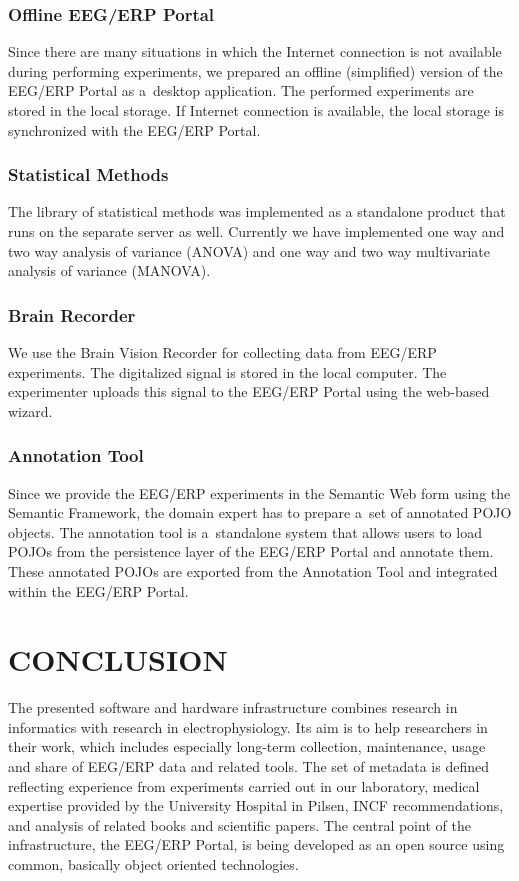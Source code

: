 \documentclass[a4paper,twoside]{article}
\begin{document}
\subsubsection{Offline EEG/ERP Portal}

Since there are many situations in which the Internet connection is not available during performing experiments, we prepared an offline (simplified) version of the EEG/ERP Portal as a~desktop application. The performed experiments are stored in the local storage. If Internet connection is available, the local storage is synchronized with the EEG/ERP Portal.

\subsubsection{Statistical Methods}

The library of statistical methods was implemented as a standalone product that runs on the separate server as well. Currently we have implemented one way and two way analysis of variance (ANOVA) and one way and two way multivariate analysis of variance (MANOVA).

\subsubsection{Brain Recorder}

We use the Brain Vision Recorder for collecting data from EEG/ERP experiments. The digitalized signal is stored in the local computer. The experimenter uploads this signal to the EEG/ERP Portal using the web-based wizard.

\subsubsection{Annotation Tool}

Since we provide the EEG/ERP experiments in the Semantic Web form using the Semantic Framework, the domain expert has to prepare a~set of annotated POJO objects. The annotation tool is a~standalone system that allows users to load POJOs from the persistence layer of the EEG/ERP Portal and annotate them. These annotated POJOs are exported from the Annotation Tool and integrated within the EEG/ERP Portal.

%
\section{\uppercase{Conclusion}}
%
\noindent 
The presented software and hardware infrastructure combines research in informatics with research in electrophysiology. Its aim is to help researchers in their work, which includes especially long-term collection, maintenance, usage and share of EEG/ERP data and related tools. The set of metadata is defined reflecting experience from experiments carried out in our laboratory, medical expertise provided by the University Hospital in Pilsen, INCF recommendations, and analysis of related books and scientific papers. The central point of the infrastructure, the EEG/ERP Portal, is being developed as an open source using common, basically object oriented technologies.
\end{document}

